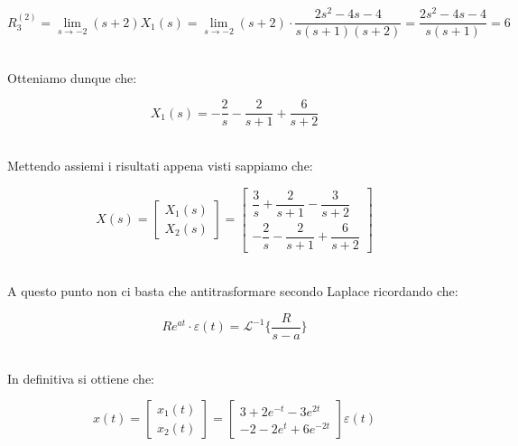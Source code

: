 \documentclass[../main.tex]{subfiles}
\begin{document}
\[ R_3^{(2)} = \lim_{s \to -2} (s+2)X_1(s) = \lim_{s \to -2} (s+2) \cdot \frac{2s^2-4s-4}{s(s+1)(s+2)} = \frac{2s^2-4s-4}{s(s+1)} = 6 \]\

Otteniamo dunque che:

\[ X_1(s) = - \frac{2}{s} - \frac{2}{s+1} + \frac{6}{s+2} \]\

Mettendo assiemi i risultati appena visti sappiamo che:

\[ X(s) = \begin{bmatrix} X_1(s) \\ X_2(s) \end{bmatrix}  = \begin{bmatrix}
	\dfrac{3}{s} + \dfrac{2}{s+1} - \dfrac{3}{s+2} \\[1em]  - \dfrac{2}{s} -
	\dfrac{2}{s+1} + \dfrac{6}{s+2} \end{bmatrix} \]\


A questo punto non ci basta che antitrasformare secondo Laplace ricordando che: 

\[ Re^{at} \cdot \varepsilon(t) = \mathcal{L}^{-1} \bigg\{ \frac{R}{s - a} \bigg\} \]\  

In definitiva si ottiene che:

\[ x(t) = \begin{bmatrix} x_1(t) \\ x_2(t) \end{bmatrix} =  \begin{bmatrix} 3 + 2e^{-t} -3e^{2t} \\ -2 -2e^{t} + 6e^{-2t} \end{bmatrix} \varepsilon (t) \]\
	
\end{document}
